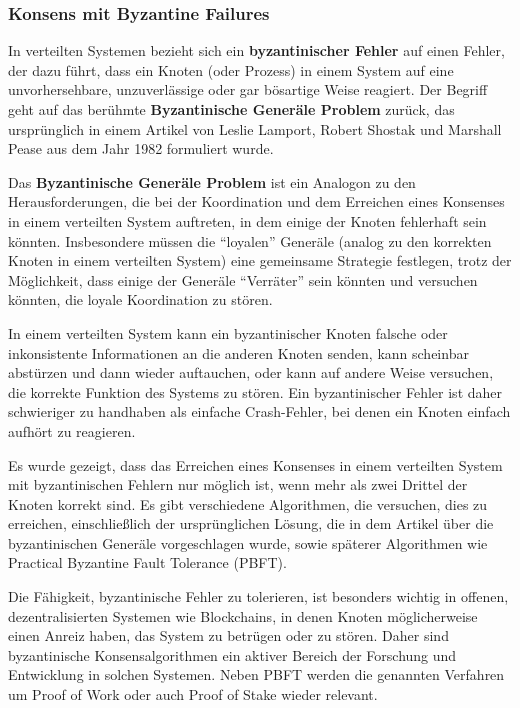 \subsubsection{Konsens mit Byzantine Failures}
In verteilten Systemen bezieht sich ein \textbf{byzantinischer Fehler} auf einen Fehler, der dazu führt, dass ein Knoten (oder Prozess) in einem System auf eine unvorhersehbare, unzuverlässige oder gar bösartige Weise reagiert. Der Begriff geht auf das berühmte \textbf{Byzantinische Generäle Problem} zurück, das ursprünglich in einem Artikel von Leslie Lamport, Robert Shostak und Marshall Pease aus dem Jahr 1982 formuliert wurde.

Das \textbf{Byzantinische Generäle Problem} ist ein Analogon zu den Herausforderungen, die bei der Koordination und dem Erreichen eines Konsenses in einem verteilten System auftreten, in dem einige der Knoten fehlerhaft sein könnten. Insbesondere müssen die \enquote{loyalen} Generäle (analog zu den korrekten Knoten in einem verteilten System) eine gemeinsame Strategie festlegen, trotz der Möglichkeit, dass einige der Generäle \enquote{Verräter} sein könnten und versuchen könnten, die loyale Koordination zu stören.

In einem verteilten System kann ein byzantinischer Knoten falsche oder inkonsistente Informationen an die anderen Knoten senden, kann scheinbar abstürzen und dann wieder auftauchen, oder kann auf andere Weise versuchen, die korrekte Funktion des Systems zu stören. Ein byzantinischer Fehler ist daher schwieriger zu handhaben als einfache Crash-Fehler, bei denen ein Knoten einfach aufhört zu reagieren.

Es wurde gezeigt, dass das Erreichen eines Konsenses in einem verteilten System mit byzantinischen Fehlern nur möglich ist, wenn mehr als zwei Drittel der Knoten korrekt sind. Es gibt verschiedene Algorithmen, die versuchen, dies zu erreichen, einschließlich der ursprünglichen Lösung, die in dem Artikel über die byzantinischen Generäle vorgeschlagen wurde, sowie späterer Algorithmen wie Practical Byzantine Fault Tolerance (PBFT).

Die Fähigkeit, byzantinische Fehler zu tolerieren, ist besonders wichtig in offenen, dezentralisierten Systemen wie Blockchains, in denen Knoten möglicherweise einen Anreiz haben, das System zu betrügen oder zu stören. Daher sind byzantinische Konsensalgorithmen ein aktiver Bereich der Forschung und Entwicklung in solchen Systemen. Neben PBFT werden die genannten Verfahren um Proof of Work oder auch Proof of Stake wieder relevant.  

